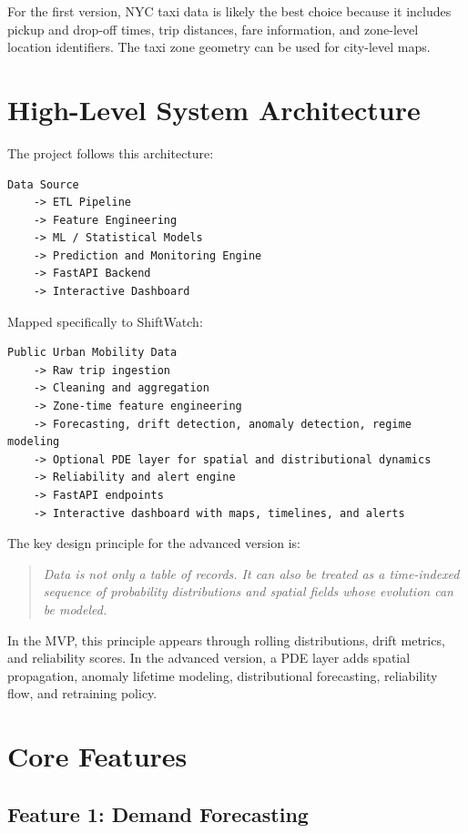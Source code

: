 \documentclass[11pt]{article}
\begin{document}
For the first version, NYC taxi data is likely the best choice because it includes pickup and drop-off times, trip distances, fare information, and zone-level location identifiers. The taxi zone geometry can be used for city-level maps.

\section{High-Level System Architecture}

The project follows this architecture:

\begin{lstlisting}
Data Source
    -> ETL Pipeline
    -> Feature Engineering
    -> ML / Statistical Models
    -> Prediction and Monitoring Engine
    -> FastAPI Backend
    -> Interactive Dashboard
\end{lstlisting}

Mapped specifically to ShiftWatch:

\begin{lstlisting}
Public Urban Mobility Data
    -> Raw trip ingestion
    -> Cleaning and aggregation
    -> Zone-time feature engineering
    -> Forecasting, drift detection, anomaly detection, regime modeling
    -> Optional PDE layer for spatial and distributional dynamics
    -> Reliability and alert engine
    -> FastAPI endpoints
    -> Interactive dashboard with maps, timelines, and alerts
\end{lstlisting}

The key design principle for the advanced version is:

\begin{quote}
    \textit{Data is not only a table of records. It can also be treated as a time-indexed sequence of probability distributions and spatial fields whose evolution can be modeled.}
\end{quote}

In the MVP, this principle appears through rolling distributions, drift metrics, and reliability scores. In the advanced version, a PDE layer adds spatial propagation, anomaly lifetime modeling, distributional forecasting, reliability flow, and retraining policy.

\section{Core Features}

\subsection{Feature 1: Demand Forecasting}
\end{document}
